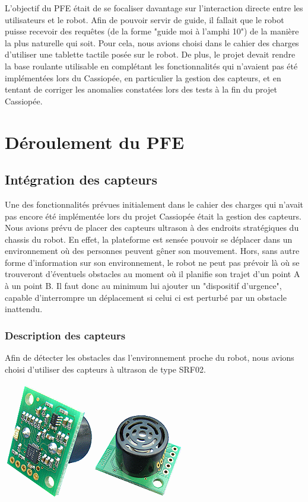 \documentclass{report}
\begin{document}
    {L'objectif du PFE était de se focaliser davantage sur l'interaction directe
     entre les utilisateurs et le robot. Afin de pouvoir servir de guide, il
     fallait que le robot puisse recevoir des requêtes (de la forme "guide
     moi à l'amphi 10") de la manière la plus naturelle qui soit. Pour cela,
     nous avions choisi dans le cahier des charges d'utiliser une tablette
     tactile posée sur le robot. De plus, le projet devait rendre la base
     roulante utilisable en complétant les fonctionnalités qui n'avaient pas
     été implémentées lors du Cassiopée, en particulier la gestion des capteurs,
     et en tentant de corriger les anomalies constatées lors des tests à la fin
     du projet Cassiopée.}



  \chapter{Déroulement du PFE}

    \section{Intégration des capteurs}

    {Une des fonctionnalités prévues initialement dans le cahier des charges qui n'avait
    pas encore été implémentée lors du projet Cassiopée était la gestion des capteurs.
    Nous avions prévu de placer des capteurs ultrason à des endroits stratégiques du
    chassis du robot. En effet, la plateforme est sensée pouvoir se déplacer
    dans un environnement où des personnes peuvent gêner son mouvement. Hors, sans
    autre forme d'information sur son environnement, le robot ne peut pas prévoir
    là où se trouveront d'éventuels obstacles au moment où il planifie son trajet d'un
    point A à un point B. Il faut donc au minimum lui ajouter un "dispositif d'urgence",
    capable d'interrompre un déplacement si celui ci est perturbé par un obstacle
    inattendu.}

        \subsection{Description des capteurs}
        {Afin de détecter les obstacles das l'environnement proche du robot, nous
        avions choisi d'utiliser des capteurs à ultrason de type SRF02.}

        \begin{center}
          \includegraphics[scale=0.6]{img/srf02.png}
        \end{center}
\end{document}
